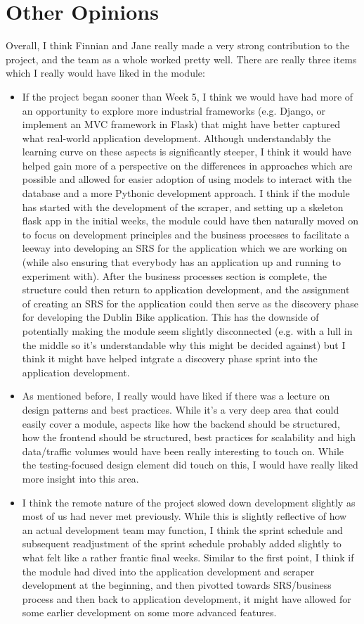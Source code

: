 \documentclass{scrreprt}
\begin{document}
\section{Other Opinions}\label{Opinions}
Overall, I think Finnian and Jane really made a very strong contribution to the project, and the team as a whole worked pretty well. There are really three items which I really would have liked in the module:
\begin{itemize}
	\item If the project began sooner than Week 5, I think we would have had more of an opportunity to explore more industrial frameworks (e.g. Django, or implement an MVC framework in Flask) that might have better captured what real-world application development. Although understandably the learning curve on these aspects is significantly steeper, I think it would have helped gain more of a perspective on the differences in approaches which are possible and allowed for easier adoption of using models to interact with the database and a more Pythonic development approach. I think if the module has started with the development of the scraper, and setting up a skeleton flask app in the initial weeks, the module could have then naturally moved on to focus on development principles and the business processes to facilitate a leeway into developing an SRS for the application which we are working on (while also ensuring that everybody has an application up and running to experiment with). After the business processes section is complete, the structure could then return to application development, and the assignment of creating an SRS for the application could then serve as the discovery phase for developing the Dublin Bike application. This has the downside of potentially making the module seem slightly disconnected (e.g. with a lull in the middle so it's understandable why this might be decided against) but I think it might have helped intgrate a discovery phase sprint into the application development.
	\item As mentioned before, I really would have liked if there was a lecture on design patterns and best practices. While it's a very deep area that could easily cover a module, aspects like how the backend should be structured, how the frontend should be structured, best practices for scalability and high data/traffic volumes would have been really interesting to touch on. While the testing-focused design element did touch on this, I would have really liked more insight into this area.
	\item I think the remote nature of the project slowed down development slightly as most of us had never met previously. While this is slightly reflective of how an actual development team may function, I think the sprint schedule and subsequent readjustment of the sprint schedule probably added slightly to what felt like a rather frantic final weeks. Similar to the first point, I think if the module had dived into the application development and scraper development at the beginning, and then pivotted towards SRS/business process and then back to application development, it might have allowed for some earlier development on some more advanced features.

\end{itemize}
\end{document}
